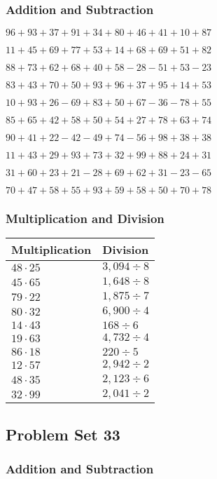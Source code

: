 \hypertarget{addition-and-subtraction-72}{%
\subsubsection{Addition and
Subtraction}\label{addition-and-subtraction-72}}

\(96+93+37+91+34+80+46+41+10+ 87\)

\(11+45+69+77+53+14+68+69+51+82\)

\(88+73+62+68+40+58-28-51+53-23\)

\(83+43+70+50+93+96+37+95+14+53\)

\(10+93+26-69+83+50+67-36-78+55\)

\(85+65+42+58+50+54+27+78+63+74\)

\(90+41+22-42-49+74-56+98+38+38\)

\(11+43+29+93+73+32+99+88+24+31\)

\(31+60+23+21-28+69+62+31-23-65\)

\(70+47+58+55+93+59+58+50+70+78\)

\hypertarget{multiplication-and-division-72}{%
\subsubsection{Multiplication and
Division}\label{multiplication-and-division-72}}

\begin{longtable}[]{@{}ll@{}}
\toprule
Multiplication & Division\tabularnewline
\midrule
\endhead
\(48\cdot25\) & \(3,094÷8\)\tabularnewline
\(45\cdot65\) & \(1,648÷8\)\tabularnewline
\(79\cdot22\) & \(1,875÷7\)\tabularnewline
\(80\cdot32\) & \(6,900÷4\)\tabularnewline
\(14\cdot43\) & \(168÷6\)\tabularnewline
\(19\cdot63\) & \(4,732÷4\)\tabularnewline
\(86\cdot18\) & \(220÷5\)\tabularnewline
\(12\cdot57\) & \(2,942÷2\)\tabularnewline
\(48\cdot35\) & \(2,123÷6\)\tabularnewline
\(32\cdot99\) & \(2,041÷2\)\tabularnewline
\bottomrule
\end{longtable}

\hypertarget{problem-set-33-1}{%
\subsection{Problem Set 33}\label{problem-set-33-1}}

\hypertarget{addition-and-subtraction-73}{%
\subsubsection{Addition and
Subtraction}\label{addition-and-subtraction-73}}

